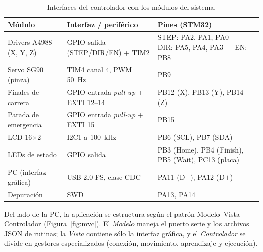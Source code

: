 \begin{table}[H]
\centering\small
\caption{Interfaces del controlador con los módulos del sistema.}\label{tab:interfaces}
\begin{tabularx}{\textwidth}{@{}l l X@{}}
\toprule
\textbf{Módulo} & \textbf{Interfaz / periférico} & \textbf{Pines (STM32)}\\
\midrule
Drivers A4988 (X, Y, Z) & GPIO salida (STEP/DIR/EN) + TIM2 & STEP: PA2, PA1, PA0 --- DIR: PA5, PA4, PA3 --- EN: PB8\\
Servo SG90 (pinza)      & TIM4 canal 4, PWM \SI{50}{\hertz} & PB9\\
Finales de carrera      & GPIO entrada \emph{pull-up} + EXTI 12--14 & PB12 (X), PB13 (Y), PB14 (Z)\\
Parada de emergencia    & GPIO entrada \emph{pull-up} + EXTI 15 & PB15\\
LCD 16$\times$2         & I2C1 a \SI{100}{\kilo\hertz} & PB6 (SCL), PB7 (SDA)\\
LEDs de estado          & GPIO salida & PB3 (Home), PB4 (Finish), PB5 (Wait), PC13 (placa)\\
PC (interfaz gráfica)   & USB 2.0 FS, clase CDC & PA11 (D$-$), PA12 (D$+$)\\
Depuración              & SWD & PA13, PA14\\
\bottomrule
\end{tabularx}
\end{table}

Del lado de la PC, la aplicación se estructura según el patrón Modelo--Vista--Controlador
(Figura~\ref{fig:mvc}). El \emph{Modelo} maneja el puerto serie y los archivos JSON de
rutinas; la \emph{Vista} contiene sólo la interfaz gráfica, y el \emph{Controlador} se
divide en gestores especializados (conexión, movimiento, aprendizaje y ejecución).

